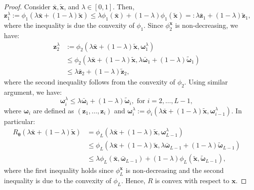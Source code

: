 \documentclass[10pt,a4paper]{amsart}
\begin{document}
\begin{proof}
Consider $\bar{\mathbf{x}},\tilde{\mathbf{x}}$, and $\lambda\in[0,1]$. Then, 
\begin{equation*}
    \mathbf{z}^{\lambda}_1:=\phi_1(\lambda\bar{\mathbf{x}}+(1-\lambda)\tilde{\mathbf{x}})\leq\lambda\phi_1(\bar{\mathbf{x}})+(1-\lambda)\phi_1(\tilde{\mathbf{x}})=:\lambda\bar{\mathbf{z}}_1+(1-\lambda)\tilde{\mathbf{z}}_1,
\end{equation*}
where the inequality is due the convexity of $\phi_1$. Since $\phi^\mathbf{x}_2$ is non-decreasing, we have:
\begin{equation}
\begin{aligned}
    \mathbf{z}^{\lambda}_2&:=\phi_2(\lambda\bar{\mathbf{x}}+(1-\lambda)\tilde{\mathbf{x}},\boldsymbol{\omega}^{\lambda}_1)\\
    &\leq\phi_2(\lambda\bar{\mathbf{x}}+(1-\lambda)\tilde{\mathbf{x}},\lambda\bar{\boldsymbol{\omega}}_1+(1-\lambda)\tilde{\boldsymbol{\omega}}_1)\\
    &\leq\lambda\bar{\mathbf{z}}_2+(1-\lambda)\tilde{\mathbf{z}}_2,
\end{aligned}
\end{equation}
where the second inequality follows from the convexity of $\phi_2$. Using similar argument, we have: 
\begin{equation}
    \boldsymbol{\omega}^{\lambda}_{i}\leq\lambda\bar{\boldsymbol{\omega}}_{i}+(1-\lambda)\tilde{\boldsymbol{\omega}}_{i}, \text{ for }i=2,\dots,L-1,
\end{equation}
where $\boldsymbol{\omega}_i$ are defined as $(\mathbf{z}_1,\dots,\mathbf{z}_i)$ and $\boldsymbol{\omega}_i^{\lambda}:=\phi_i(\lambda\bar{\mathbf{x}}+(1-\lambda)\tilde{\mathbf{x}},\boldsymbol{\omega}_{i-1}^{\lambda})$. 
In particular:
\begin{equation}
\begin{aligned}
    R_{\boldsymbol{\theta}}(\lambda\bar{\mathbf{x}}+(1-\lambda)\tilde{\mathbf{x}})&=\phi_L(\lambda\bar{\mathbf{x}}+(1-\lambda)\tilde{\mathbf{x}},\boldsymbol{\omega}^{\lambda}_{L-1})\\
    &\leq\phi_L(\lambda\bar{\mathbf{x}}+(1-\lambda)\tilde{\mathbf{x}},\lambda\bar{\boldsymbol{\omega}}_{L-1}+(1-\lambda)\tilde{\boldsymbol{\omega}}_{L-1})\\
    &\leq\lambda\phi_L(\bar{\mathbf{x}},\bar{\boldsymbol{\omega}}_{L-1})+(1-\lambda)\phi_L(\tilde{\mathbf{x}},\tilde{\boldsymbol{\omega}}_{L-1}),
\end{aligned}
\end{equation}
where the first inequality holds since $\phi^\mathbf{x}_L$ is non-decreasing and the second inequality is due to the convexity of $\phi_L$. Hence, $R$ is convex with respect to $\mathbf{x}$.
\end{proof}
\end{document}
